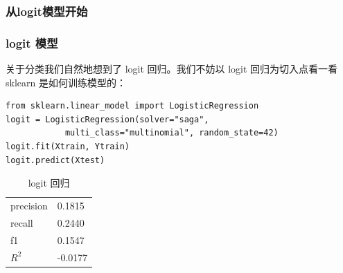 \documentclass[mathserif,envcountsect,fontset=mac]{ctexbeamer}
\begin{document}
\subsubsection{从logit模型开始}
\begin{frame}[fragile]
    \frametitle{logit 模型}
    关于分类我们自然地想到了 logit 回归。我们不妨以 logit 回归为切入点看一看 sklearn 是如何训练模型的：

    \begin{verbatim}
from sklearn.linear_model import LogisticRegression
logit = LogisticRegression(solver="saga", 
            multi_class="multinomial", random_state=42)
logit.fit(Xtrain, Ytrain)
logit.predict(Xtest)
    \end{verbatim}

    \begin{table}
        \caption{logit 回归}
        \begin{tabular}{ll}
            precision & 0.1815  \\
            recall    & 0.2440  \\
            f1        & 0.1547  \\
            \(R^2\)   & -0.0177 \\
        \end{tabular}
        \label{logit}
    \end{table}
\end{frame}
\end{document}
